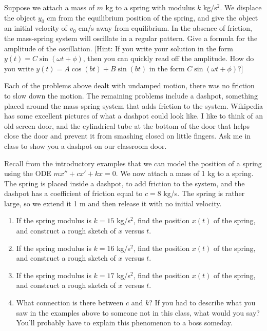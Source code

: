 \begin{problem}
 Suppose we attach a mass of $m$ kg to a spring with modulus $k$ kg/s$^2$. We displace the object $y_0$ cm from the equilibrium position of the spring, and give the object an initial velocity of $v_0$ cm/s away from equilibrium. In the absence of friction, the mass-spring system will oscillate in a regular pattern. Give a formula for the amplitude of the oscillation. [Hint: If you write your solution in the form $y(t) = C\sin(\omega t+\phi)$, then you can quickly read off the amplitude. How do you write $y(t) = A\cos(bt)+B\sin(bt)$ in the form $C\sin(\omega t+\phi)$?] 
\end{problem}

Each of the problems above dealt with undamped motion, there was no friction to slow down the motion.  The remaining problems include a dashpot, something placed around the mass-spring system that adds friction to the system. Wikipedia has some excellent pictures of what a dashpot could look like.  I like to think of an old screen door, and the cylindrical tube at the bottom of the door that helps close the door and prevent it from smashing closed on little fingers.  Ask me in class to show you a dashpot on our classroom door.

\begin{problem}
 Recall from the introductory examples that we can model the position of a spring using the ODE $mx''+cx'+kx=0$. 
 We now attach a mass of 1 kg to a spring. The spring is placed inside a dashpot, to add friction to the system, and the dashpot has a coefficient of friction equal to $c=8$ kg/s. The spring is rather large, so we extend it 1 m and then release it with no initial velocity. 
\begin{enumerate}
 \item If the spring modulus is $k=15$ kg/s$^2$, find the position $x(t)$ of the spring, and construct a rough sketch of $x$ versus $t$.  
 \item If the spring modulus is $k=16$ kg/s$^2$, find the position $x(t)$ of the spring, and construct a rough sketch of $x$ versus $t$.  
 \item If the spring modulus is $k=17$ kg/s$^2$, find the position $x(t)$ of the spring, and construct a rough sketch of $x$ versus $t$.  
 \item What connection is there between $c$ and $k$? If you had to describe what you saw in the examples above to someone not in this class, what would you say?  You'll probably have to explain this phenomenon to a boss someday. 
\end{enumerate}
\end{problem}



